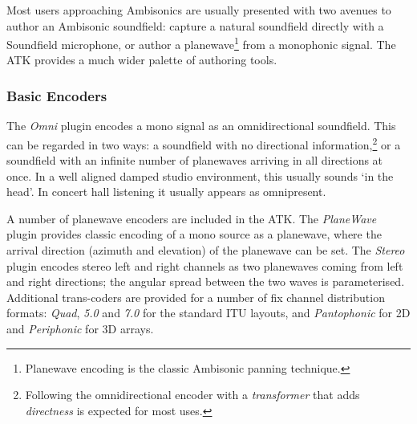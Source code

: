 \documentclass{article}
\begin{document}
Most users approaching Ambisonics are usually presented with two avenues to author an Ambisonic soundfield: capture a natural soundfield directly with a Soundfield microphone, or author a planewave\footnote{Planewave encoding is the classic Ambisonic panning technique.} from a monophonic signal.
The ATK provides a much wider palette of authoring tools.

%

\subsubsection{Basic Encoders}\label{sec:bas-encoders}
The \emph{Omni} plugin encodes a mono signal as an omnidirectional soundfield. This can be regarded in two ways:
a soundfield with no directional information,\footnote{Following the omnidirectional encoder with a \emph{transformer} that adds \emph{directness} is expected for most uses.} or a soundfield with an infinite number of plane\-waves arriving in all directions at once. In a well aligned damped studio environment, this usually sounds `in the head'. In concert hall listening it usually appears as omnipresent.

A number of planewave encoders are included in the ATK. The \emph{PlaneWave} plugin provides classic encoding of a mono source as a plane\-wave, where the arrival direction (azimuth and elevation) of the planewave can be set.
The \emph{Stereo} plugin encodes stereo left and right channels as two planewaves coming from left and right directions; the angular spread between the two waves is parameterised.
Additional trans-coders are provided for a number of fix channel distribution formats: \emph{Quad}, \emph{5.0} and \emph{7.0} for the standard ITU layouts, and \emph{Pantophonic} for 2D and \emph{Periphonic} for 3D arrays.
\end{document}
